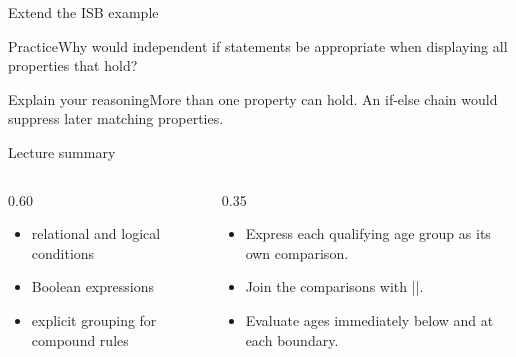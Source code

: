 \documentclass[10pt,aspectratio=169]{beamer}
\begin{document}
\begin{frame}[fragile,t]{Extend the ISB example}
\begin{alertblock}{Practice}Why would independent if statements be appropriate when displaying all properties that hold?\end{alertblock}\vspace{3mm}\begin{exampleblock}{Explain your reasoning}More than one property can hold. An if{-}else chain would suppress later matching properties.\end{exampleblock}
\end{frame}
\begin{frame}[fragile,t]{Lecture summary}
\begin{columns}[T,onlytextwidth]\begin{column}{0.60\textwidth}
\begin{itemize}
\item relational and logical conditions
\item Boolean expressions
\item explicit grouping for compound rules
\end{itemize}
\end{column}\begin{column}{0.35\textwidth}\small
\begin{itemize}
\item Express each qualifying age group as its own comparison.
\item Join the comparisons with ||.
\item Evaluate ages immediately below and at each boundary.
\end{itemize}
\end{column}\end{columns}
\end{frame}
\end{document}
